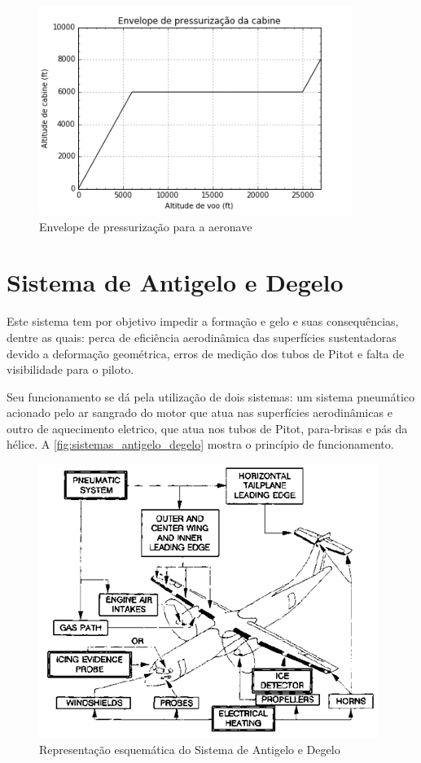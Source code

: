 \begin{figure}
    \centering
    \includegraphics[width=4in]{images/cabin_envelope.png}
    \caption{Envelope de pressurização para a aeronave}
    \label{fig:envelope_pressurizacao}
\end{figure}


\section{Sistema de Antigelo e Degelo}

Este sistema tem por objetivo impedir a formação e gelo e suas consequências, dentre as quais: perca de eficiência aerodinâmica das superfícies sustentadoras devido a deformação geométrica, erros de medição dos tubos de Pitot e falta de visibilidade para o piloto.

Seu funcionamento se dá pela utilização de dois sistemas: um sistema pneumático acionado pelo ar sangrado do motor que atua nas superfícies aerodinâmicas e outro de aquecimento eletrico, que atua nos tubos de Pitot, para-brisas e pás da hélice.
A \autoref{fig:sistemas_antigelo_degelo} mostra o princípio de funcionamento.

\begin{figure}
\centering
\includegraphics[width=\textwidth]{images/parte3/sistemas_antigelo_degelo.png}
\caption{Representação esquemática do Sistema de Antigelo e Degelo}
\label{fig:sistemas_antigelo_degelo}
\end{figure}


